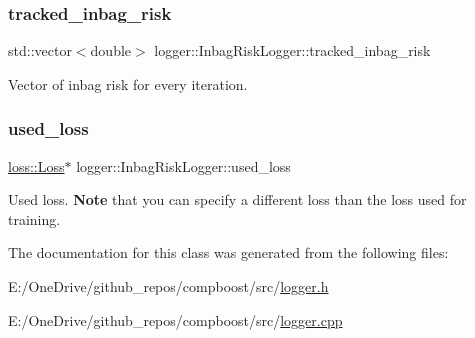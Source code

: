 \subsubsection{\texorpdfstring{tracked\+\_\+inbag\+\_\+risk}{tracked\_inbag\_risk}}
{\footnotesize\ttfamily std\+::vector$<$double$>$ logger\+::\+Inbag\+Risk\+Logger\+::tracked\+\_\+inbag\+\_\+risk\hspace{0.3cm}{\ttfamily [private]}}



Vector of inbag risk for every iteration. 

\mbox{\label{classlogger_1_1_inbag_risk_logger_afee746bf4009661f930ea8294e7f72fc}} 
\subsubsection{\texorpdfstring{used\+\_\+loss}{used\_loss}}
{\footnotesize\ttfamily \mbox{\hyperlink{classloss_1_1_loss}{loss\+::\+Loss}}$\ast$ logger\+::\+Inbag\+Risk\+Logger\+::used\+\_\+loss\hspace{0.3cm}{\ttfamily [private]}}



Used loss. {\bfseries Note} that you can specify a different loss than the loss used for training. 



The documentation for this class was generated from the following files\+:\begin{DoxyCompactItemize}
\item 
E\+:/\+One\+Drive/github\+\_\+repos/compboost/src/\mbox{\hyperlink{logger_8h}{logger.\+h}}\item 
E\+:/\+One\+Drive/github\+\_\+repos/compboost/src/\mbox{\hyperlink{logger_8cpp}{logger.\+cpp}}\end{DoxyCompactItemize}
